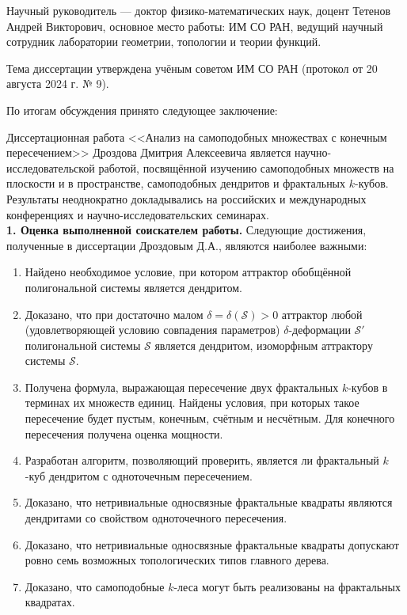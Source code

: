 \documentclass[14pt, a4paper]{extarticle}
\begin{document}
Научный руководитель --- доктор физико-математических наук, доцент Тетенов Андрей Викторович, основное место работы: ИМ СО РАН, ведущий научный сотрудник лаборатории геометрии, топологии и теории функций.

Тема диссертации утверждена учёным советом ИМ СО РАН (протокол от 20 августа 2024 г. № 9).

По итогам обсуждения принято следующее заключение:

Диссертационная работа <<Анализ на самоподобных множествах с конечным пересечением>> Дроздова Дмитрия Алексеевича является научно-ис\-сле\-до\-ва\-тель\-ской работой, посвящённой изучению самоподобных множеств на плоскости и в пространстве, самоподобных дендритов и фрактальных $k$-кубов.
Результаты неоднократно докладывались на российских и международных конференциях и научно-исследовательских семинарах.\\

{\bf 1. Оценка выполненной соискателем работы.}
Следующие достижения, полученные в диссертации Дроздовым Д.А., являются наиболее важными:

\begin{enumerate}[nolistsep]
\item Найдено необходимое условие, при котором аттрактор обобщённой полигональной системы является дендритом.
\item Доказано, что при достаточно малом $\delta=\delta(\mathcal{S})>0$ аттрактор любой (удовлетворяющей условию совпадения параметров) $\delta$-деформации $\mathcal{S}'$ полигональной системы $\mathcal{S}$ является дендритом, изоморфным аттрактору системы $\mathcal{S}$.
\item Получена формула, выражающая пересечение двух фрактальных $k$-кубов в терминах их множеств единиц.
Найдены условия, при которых такое пересечение будет пустым, конечным, счётным и несчётным.
Для конечного пересечения получена оценка мощности.
\item Разработан алгоритм, позволяющий проверить, является ли фрактальный $k$-куб дендритом с одноточечным пересечением.
\item Доказано, что нетривиальные односвязные фрактальные квадраты являются дендритами со свойством одноточечного пересечения.
\item Доказано, что нетривиальные односвязные фрактальные квадраты допускают ровно семь возможных топологических типов главного дерева.
\item Доказано, что самоподобные $k$-леса могут быть реализованы на фрактальных квадратах.
\end{enumerate}\quad
\end{document}
